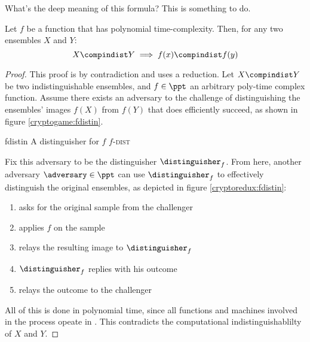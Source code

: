 What's the deep meaning of this formula? This is something to do.

\begin{lemma} \label{lem:compmall}
    Let $f$ be a function that has polynomial time-complexity. Then, for any two ensembles $X$ and $Y$:
    \[
        X \compindist Y \implies f(x) \compindist f(y)
    \]
\end{lemma}

\begin{proof}
    This proof is by contradiction and uses a reduction. Let $X \compindist Y$ be two indistinguishable ensembles, and $f \in \ppt$ an arbitrary poly-time complex function. Assume there exists an adversary \adversary{} to the challenge of distinguishing the ensembles' images $f(X)$ from $f(Y)$ that does efficiently succeed, as shown in figure \ref{cryptogame:fdistin}. 
    
    \begin{cryptogame}
        {fdistin}
        {A distinguisher for $f$}
        {$f$-\textsc{dist}}


        \cseqdelay


    \end{cryptogame}
    
    Fix this adversary to be the distinguisher $\distinguisher_f$. From here, another adversary $\adversary \in \ppt$ can use $\distinguisher_f$ to effectively distinguish the original ensembles, as depicted in figure \ref{cryptoredux:fdistin}:
    \begin{enumerate}
        \item \adversary asks for the original sample from the challenger
        \item \adversary applies $f$ on the sample
        \item \adversary relays the resulting image to $\distinguisher_f$
        \item $\distinguisher_f$ replies with his outcome
        \item \adversary relays the outcome to the challenger
    \end{enumerate}
    All of this is done in polynomial time, since all functions and machines involved in the process opeate in \ppt. This contradicts the computational indistinguishablilty of $X$ and $Y$.


\end{proof}
